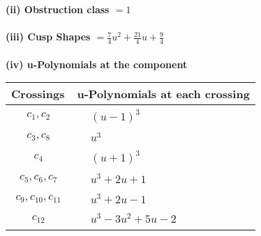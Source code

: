 \documentclass[1p]{elsarticle_modified}
\theoremstyle{definition}
\begin{document}
\flushleft \textbf{(ii) Obstruction class $= 1$}\\~\\
\flushleft \textbf{(iii) Cusp Shapes $= \frac{7}{4} u^2+\frac{21}{4} u+\frac{9}{4}$}\\~\\
\newpage\renewcommand{\arraystretch}{1}
\flushleft \textbf{(iv) u-Polynomials at the component}\newline \\
\begin{tabular}{m{50pt}|m{274pt}}
Crossings & \hspace{64pt}u-Polynomials at each crossing \\
\hline $$\begin{aligned}c_{1},c_{2}\end{aligned}$$&$\begin{aligned}
&(u-1)^3
\end{aligned}$\\
\hline $$\begin{aligned}c_{3},c_{8}\end{aligned}$$&$\begin{aligned}
&u^3
\end{aligned}$\\
\hline $$\begin{aligned}c_{4}\end{aligned}$$&$\begin{aligned}
&(u+1)^3
\end{aligned}$\\
\hline $$\begin{aligned}c_{5},c_{6},c_{7}\end{aligned}$$&$\begin{aligned}
&u^3+2 u+1
\end{aligned}$\\
\hline $$\begin{aligned}c_{9},c_{10},c_{11}\end{aligned}$$&$\begin{aligned}
&u^3+2 u-1
\end{aligned}$\\
\hline $$\begin{aligned}c_{12}\end{aligned}$$&$\begin{aligned}
&u^3-3 u^2+5 u-2
\end{aligned}$\\
\hline
\end{tabular}\\~\\
\end{document}
